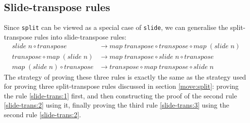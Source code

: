 \documentclass{l4proj}
\begin{document}
\subsection{Slide-transpose rules}
\label{move:slide}
Since \texttt{split} can be viewed as a special case of \texttt{slide}, we can generalise the split-transpose rules into slide-transpose rules:
\begin{align}
    \label{slide-trans:1}
    slide\; n \circ transpose &\to map\; transpose \circ transpose \circ map\; (slide\; n)\\
    \label{slide-trans:2}
    transpose \circ map\; (slide\; n) &\to map\; transpose \circ slide\; n \circ transpose\\
    \label{slide-trans:3}
    map\; (slide\; n) \circ transpose &\to transpose \circ map\; transpose \circ slide\; n
\end{align}
The strategy of proving these three rules is exactly the same as the strategy used for proving three split-transpose rules discussed in section \ref{move:split}: proving the rule \ref{slide-trans:1} first, and then constructing the proof of the second rule \ref{slide-trans:2} using it, finally proving the third rule \ref{slide-trans:3} using the second rule \ref{slide-trans:2}.
\end{document}
